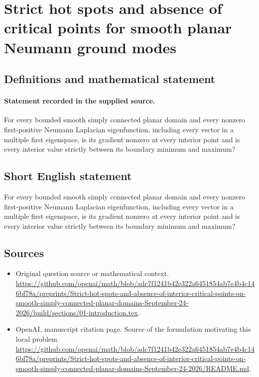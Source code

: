 \documentclass[11pt]{article}
\begin{document}
\section*{Strict hot spots and absence of critical points for smooth planar Neumann ground modes}\label{30007338}
\subsection{Definitions and mathematical statement}
\paragraph{Statement recorded in the supplied source.}
For every bounded smooth simply connected planar domain and every nonzero first-positive Neumann Laplacian eigenfunction, including every vector in a multiple first eigenspace, is its gradient nonzero at every interior point and is every interior value strictly between its boundary minimum and maximum?
\subsection{Short English statement}
For every bounded smooth simply connected planar domain and every nonzero first-positive Neumann Laplacian eigenfunction, including every vector in a multiple first eigenspace, is its gradient nonzero at every interior point and is every interior value strictly between its boundary minimum and maximum?
\subsection{Sources}
\begin{itemize}
\item[S1] Original question source or mathematical context.
\url{https://github.com/openai/math/blob/adc7f1241b42e322a6451854ab7e4b4c146bf78a/preprints/Strict-hot-spots-and-absence-of-interior-critical-points-on-smooth-simply-connected-planar-domains-September-24-2026/build/sections/01-introduction.tex}.
\item[S2] OpenAI, manuscript citation page. Source of the formulation motivating this local problem.
\url{https://github.com/openai/math/blob/adc7f1241b42e322a6451854ab7e4b4c146bf78a/preprints/Strict-hot-spots-and-absence-of-interior-critical-points-on-smooth-simply-connected-planar-domains-September-24-2026/README.md}.
\end{itemize}
\end{document}
